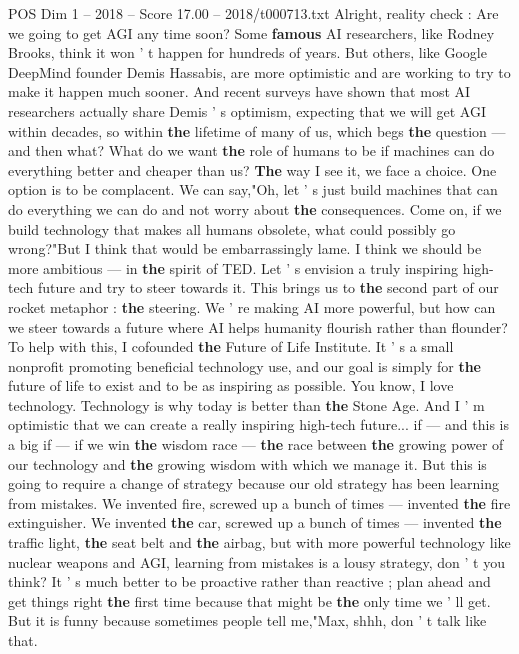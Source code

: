\begin{textsample}{POS Dim 1 – 2018 – Score 17.00 – 2018/t000713.txt}
Alright, reality check : Are we going to get AGI any time soon?
Some \textbf{famous} AI researchers, like Rodney Brooks, think it won ' t happen for hundreds of years.
But others, like Google DeepMind founder Demis Hassabis, are more optimistic and are working to try to make it happen much sooner.
And recent surveys have shown that most AI researchers actually share Demis ' s optimism, expecting that we will get AGI within decades, so within \textbf{the} lifetime of many of us, which begs \textbf{the} question — and then what?
What do we want \textbf{the} role of humans to be if machines can do everything better and cheaper than us? \textbf{The} way I see it, we face a choice.
One option is to be complacent.
We can say,"Oh, let ' s just build machines that can do everything we can do and not worry about \textbf{the} consequences.
Come on, if we build technology that makes all humans obsolete, what could possibly go wrong?"But I think that would be embarrassingly lame.
I think we should be more ambitious — in \textbf{the} spirit of TED.
Let ' s envision a truly inspiring high-tech future and try to steer towards it.
This brings us to \textbf{the} second part of our rocket metaphor : \textbf{the} steering.
We ' re making AI more powerful, but how can we steer towards a future where AI helps humanity flourish rather than flounder?
To help with this, I cofounded \textbf{the} Future of Life Institute.
It ' s a small nonprofit promoting beneficial technology use, and our goal is simply for \textbf{the} future of life to exist and to be as inspiring as possible.
You know, I love technology.
Technology is why today is better than \textbf{the} Stone Age.
And I ' m optimistic that we can create a really inspiring high-tech future... if — and this is a big if — if we win \textbf{the} wisdom race — \textbf{the} race between \textbf{the} growing power of our technology and \textbf{the} growing wisdom with which we manage it.
But this is going to require a change of strategy because our old strategy has been learning from mistakes.
We invented fire, screwed up a bunch of times — invented \textbf{the} fire extinguisher.
We invented \textbf{the} car, screwed up a bunch of times — invented \textbf{the} traffic light, \textbf{the} seat belt and \textbf{the} airbag, but with more powerful technology like nuclear weapons and AGI, learning from mistakes is a lousy strategy, don ' t you think?
It ' s much better to be proactive rather than reactive ; plan ahead and get things right \textbf{the} first time because that might be \textbf{the} only time we ' ll get.
But it is funny because sometimes people tell me,"Max, shhh, don ' t talk like that.

\end{textsample}
